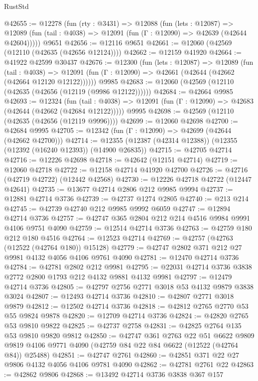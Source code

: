 \begin{lexlean}{RustStd}
\begin{coremodule}
@42655 := @12278
    (fun (rty : @3431) =>
    @12088
      (fun (lets : @12087) =>
      @12089 (fun (tail : @4038) => @12091 (fun (Γ : @12090) => @42639 (@42644 @42604)))))
    @9651
@42656 := @12116 @9651
@42661 := @12060 (@42569 (@12110 (@42635 (@42656 @12124))))
@42662 := @12159 @41920
@42664 := @41922 @42599 @30437
@42676 := @12300
    (fun (lets : @12087) =>
    @12089
      (fun (tail : @4038) =>
      @12091 (fun (Γ : @12090) => @42661 (@42644 (@42662 (@42664 @12120 @12122))))))
    @9985
@42683 := @12060 (@42569 (@12110 (@42635 (@42656 (@12119 (@9986 @12122))))))
@42684 := @42664 @9985
@42693 := @12324
    (fun (tail : @4038) => @12091 (fun (Γ : @12090) => @42683 (@42644 (@42662 (@42684 @12122)))))
    @9995
@42698 := @42569 (@12110 (@42635 (@42656 (@12119 @9996))))
@42699 := @12060 @42698
@42700 := @42684 @9995
@42705 := @12342 (fun (Γ : @12090) => @42699 (@42644 (@42662 @42700)))
@42714 := @12355 (@12387 (@42314 @12388)) (@12355 (@12392 (@16240 @12393)) (@14900 @26835))
@42715 := @42705 @42714
@42716 := @12226 @42698
@42718 := @42642 (@12151 @42714)
@42719 := @12060 @42718
@42722 := @12158 @42714 @41920 @42700
@42726 := @42716 (@42719 @42722) (@12442 @42568)
@42730 := @12226 @42718 @42722 (@12447 @42641)
@42735 := @13677 @42714 @2806 @212 @9985 @9994
@42737 := @12881 @42714 @3736
@42739 := @42737 @1274 @2805
@42740 := @213 @214
@42745 := @42739 @42740 @212 @9985 @9992 @6059
@42747 := @12894 @42714 @3736
@42757 := @42747 @365 @2804 @212 @214 @4516 @9984 @9991 @4106 @9751 @4090
@42759 := @12514 @42714 @3736
@42763 := @42759 @180 @212 @180 @4516
@42764 := @12523 @42714
@42769 := @42757 (@42763 (@12522 (@42764 @180)) @15128)
@42779 := @42747 @2802 @371 @212 @27 @9981 @4132 @4056 @4106 @9761 @4090
@42781 := @12470 @42714 @3736
@42784 := @42781 @2802 @212 @9981
@42795 := @22031 @42714 @3736 @3838 @2772 @2800 @1793 @212 @4132 @9881 @4132 @9981
@42797 := @12479 @42714 @3736
@42805 := @42797 @2756 @2771 @3018 @53 @4132 @9879 @3838 @3024
@42807 := @12493 @42714 @3736
@42810 := @42807 @2771 @3018 @9879
@42812 := @12502 @42714 @3736
@42818 := @42812 @2765 @2770 @53 @55 @9824 @9878
@42820 := @12709 @42714 @3736
@42824 := @42820 @2765 @53 @9810 @9822
@42825 := @42737 @2758
@42831 := @42825 @2764 @135 @53 @9810 @9820 @9812
@42850 := @42747
    @361
    @2763
    @22
    @51
    @6622
    @9809
    @9819
    @4106
    @9771
    @4090
    (@42759 @84 @22 @84 @6622 (@12522 (@42764 @84)) @25488)
@42851 := @42747 @2761
@42860 := @42851 @371 @22 @27 @9806 @4132 @4056 @4106 @9781 @4090
@42862 := @42781 @2761 @22
@42863 := @42862 @9806
@42868 := @13492 @42714 @3736 @3838 @367 @157

\end{coremodule}
\end{lexlean}
